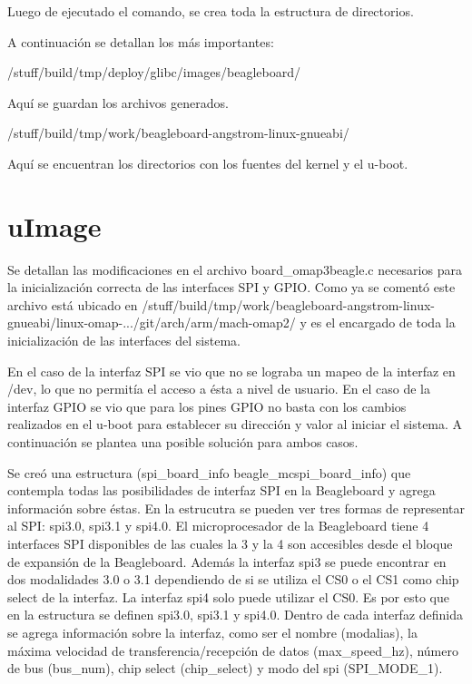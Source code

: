 \bigskip
Luego de ejecutado el comando, se crea toda la estructura de directorios.

\bigskip
A continuación se detallan los más importantes:

\bigskip
/stuff/build/tmp/deploy/glibc/images/beagleboard/ 

Aquí se guardan los archivos generados.

\bigskip
/stuff/build/tmp/work/beagleboard-angstrom-linux-gnueabi/

Aquí se encuentran los directorios con los fuentes del kernel y el u-boot.

\section{uImage}\label{anx_sw_uIm}

Se detallan las modificaciones en el archivo board\_omap3beagle.c necesarios para la inicialización correcta de las interfaces SPI y GPIO. Como ya se comentó este archivo está ubicado en /stuff/build/tmp/work/beagleboard-angstrom-linux-gnueabi/linux-omap-.../git/arch/arm/mach-omap2/ y es el encargado de toda la inicialización de las interfaces del sistema.

\bigskip
En el caso de la interfaz SPI se vio que no se lograba un mapeo de la interfaz en /dev, lo que no permitía el acceso a ésta a nivel de usuario. En el caso de la interfaz GPIO se vio que para los pines GPIO no basta con los cambios realizados en el u-boot para establecer su dirección y valor al iniciar el sistema.
A continuación se plantea una posible solución para ambos casos.

\bigskip
{}

\bigskip
Se creó una estructura (spi\_board\_info beagle\_mcspi\_board\_info) que contempla todas las posibilidades de interfaz SPI en la Beagleboard y agrega información sobre éstas.
En la estrucutra se pueden ver tres formas de representar al SPI: spi3.0, spi3.1 y spi4.0. El microprocesador de la Beagleboard tiene 4 interfaces SPI disponibles de las cuales la 3 y la 4 son accesibles desde el bloque de expansión de la Beagleboard. Además la interfaz spi3 se puede encontrar en dos modalidades 3.0 o 3.1 dependiendo de si se utiliza el CS0 o el CS1 como chip select de la interfaz. La interfaz spi4 solo puede utilizar el CS0.
Es por esto que en la estructura se definen spi3.0, spi3.1 y spi4.0.
Dentro de cada interfaz definida se agrega información sobre la interfaz, como ser el nombre (modalias), la máxima velocidad de transferencia/recepción de datos (max\_speed\_hz), número de bus (bus\_num), chip select (chip\_select) y modo del spi (SPI\_MODE\_1).

